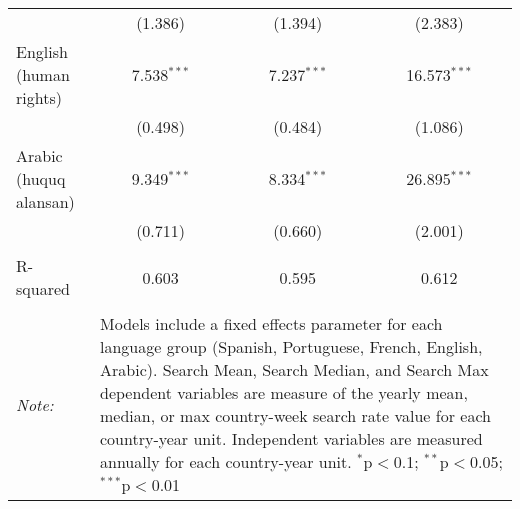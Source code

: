 \begin{table}[!htbp]
\begin{tabular}{@{\extracolsep{5pt}}lccc}
  & (1.386) & (1.394) & (2.383) \\ 
  English (human rights) & 7.538$^{***}$ & 7.237$^{***}$ & 16.573$^{***}$ \\ 
  & (0.498) & (0.484) & (1.086) \\ 
  Arabic (huquq alansan) & 9.349$^{***}$ & 8.334$^{***}$ & 26.895$^{***}$ \\ 
  & (0.711) & (0.660) & (2.001) \\ 
 \hline \\[-1.8ex] 
R-squared  & 0.603 & 0.595 & 0.612 \\ 
\hline 
\hline \\[-1.8ex] 
\textit{Note:}  & \multicolumn{3}{l}{\parbox[t]{8cm}{Models include a fixed effects parameter for each language group (Spanish, Portuguese, French, English, Arabic). Search Mean, Search Median, and Search Max dependent variables are measure of the yearly mean, median, or max country-week search rate value for each country-year unit. Independent variables are measured annually for each country-year unit. $^{*}$p$<$0.1; $^{**}$p$<$0.05; $^{***}$p$<$0.01}} \\ 
\end{tabular} 
\end{table} 
